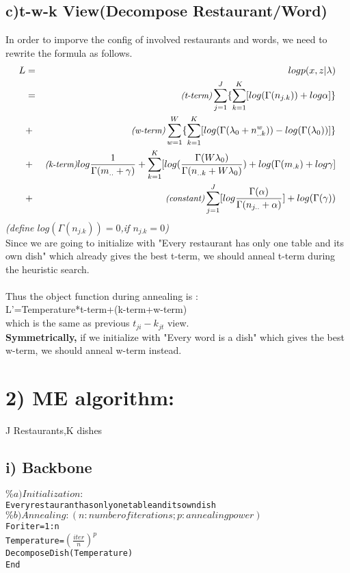 \documentclass{article}
\begin{document}
\begin{spacing}{1.1}
\subsection{c)t-w-k View(Decompose Restaurant/Word)}
In order to imporve the config of involved restaurants and words, we need to rewrite the formula as follows.\\
\begin{eqnarray*}
L&=&log p(x,z|\lambda)\\
&=&\emph{{\small(t-term)}}\sum_{j=1}^{J} \{\sum_{k=1}^{K}[log(\Gamma(n_{j.k}))+log \alpha]\}\\
&+&\emph{{\small(w-term)}}\sum_{w=1}^{W} \{\sum_{k=1}^{K}[log(\Gamma(\lambda_{0}+n_{..k}^{w}))-log(\Gamma(\lambda_{0}))]\}\\
&+&\emph{{\small(k-term)}}log \frac{1}{\Gamma(m_{..}+\gamma)}+\sum_{k=1}^{K} [log(\frac{\Gamma(W\lambda_{0})}{\Gamma(n_{..k}+W\lambda_{0})})+log(\Gamma(m_{.k})+log \gamma]\\
&+&\emph{{\small(constant)}}\sum_{j=1}^{J} [log \frac{\Gamma(\alpha)}{\Gamma(n_{j..}+\alpha)}]+log(\Gamma(\gamma))\\ 
\end{eqnarray*}
\emph{{\small(define $log(\Gamma(n_{j.k}))=0$,if $n_{j.k}=0$)}}\\
Since we are going to initialize with "Every restaurant has only one table and its own dish" which already gives the best t-term, we should
anneal t-term during the heuristic search.\\ \\
Thus the object function during annealing is :\\
L'=Temperature*t-term+(k-term+w-term)\\
which is the same as previous $t_{ji}-k_{jt}$ view.\\ 
{\bf Symmetrically,} if we initialize with "Every word is a dish" which gives the best w-term, we should anneal w-term instead.


\section{2) ME algorithm: }
J Restaurants,K dishes
\subsection{i) Backbone}
\begin{alltt}
  \(\%a)Initialization:\)
      Every restaurant has only one table and its own dish
  \(\%b)Annealing:(n:number of iterations; p:annealing power)\)
      For iter=1:n
          Temperature=\((\frac{iter}{n})^p\)
          Decompose Dish(Temperature)
      End


\end{alltt}
\end{spacing}
\end{document}
